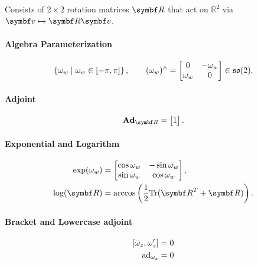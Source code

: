 \begin{properties}[breakable, title={$\SOtwo$ formula sheet}]
  Consists of $2 \times 2$ rotation matrices $\bR$ that act on $\mathbb{R}^{2}$ via $\bv \mapsto \bR \bv$.

  \paragraph{Algebra Parameterization}
  \begin{equation}
    \left\{ \omega_{w} \mid \omega_{w} \in [-\pi, \pi] \right\}, \qquad (\omega_{w})^\wedge = \begin{bmatrix} 0 & -\omega_{w} \\ \omega_{w} & 0 \end{bmatrix} \in {\mathfrak{so}(2)}.
  \end{equation}

  \paragraph{Adjoint}
  \begin{equation}
    \bAd_{\bR} = \begin{bmatrix} 1 \end{bmatrix}.
  \end{equation}

  \paragraph{Exponential and Logarithm}
  \begin{subequations}
    \begin{align}
      \label{eq:so2_exp}
      \exp (\omega_w) & = \begin{bmatrix} \cos \omega_{w} & -\sin \omega_{w} \\ \sin \omega_{w} & \cos \omega_{w} \end{bmatrix},                           \\
      \label{eq:so2_log}
      \log (\bR)      & = \arccos \left( \frac{1}{2} \tr (\bR^T + \bR) \right).
    \end{align}
  \end{subequations}

  \paragraph{Bracket and Lowercase adjoint}
  \begin{subequations}
    \begin{align}
      \left[ \omega_{z}, \omega_{z}' \right ] & = 0 \\
      \operatorname{ad}_{\omega_z}                          & = 0
    \end{align}
  \end{subequations}


\end{properties}
